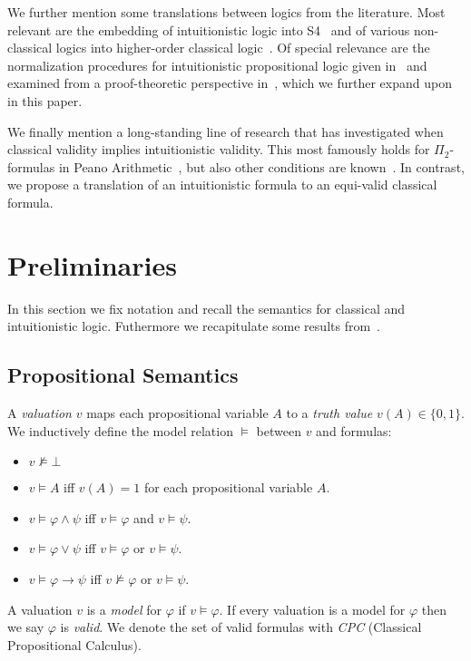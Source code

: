 \documentclass[runningheads]{llncs}
\begin{document}
We further mention some translations between logics from the literature.
Most relevant are the embedding of intuitionistic logic into S4~\cite{basicprooftheory} and of various non-classical logics into higher-order classical logic~\cite{LEO,wisniewski2016tptp}.
Of special relevance are the normalization procedures for intuitionistic propositional logic given in~\cite{claessen2015sat}
and examined from a proof-theoretic perspective in~\cite{fiorentini2019proof}, which we further expand upon in this paper.

We finally mention a long-standing line of research that has investigated when classical validity implies intuitionistic validity.
This most famously holds for $\Pi_2$-formulas in Peano Arithmetic~\cite{friedman1978classically}, but also other conditions are known~\cite{schwichtenberg}. 
In contrast, we propose a translation of an intuitionistic formula to an equi-valid classical formula.


\section{Preliminaries}

In this section we fix notation and recall the semantics for classical and intuitionistic logic. Futhermore we recapitulate some results from~\cite{otten2005clausal}.

\subsection{Propositional Semantics}

\begin{definition}
	A \emph{valuation} $v$ maps each propositional variable $A$ to a \emph{truth value} $v(A)\in\{0, 1\}$. We inductively define the model relation $\models$ between $v$ and formulas:
	\begin{itemize}
		\item $v\not\models \bot$
		\item $v\models A$ iff $v(A) = 1$ for each propositional variable $A$.
		\item $v\models \varphi\wedge\psi$ iff $v\models\varphi$ and $v\models\psi$.
		\item $v\models\varphi\vee\psi$ iff $v\models\varphi$ or $v\models\psi$.
		\item $v\models\varphi\to \psi$ iff $v\not\models\varphi$ or $v\models\psi$.
	\end{itemize}
	A valuation $v$ is a \emph{model} for $\varphi$ if $v\models\varphi$. If every valuation is a model for $\varphi$ then we say $\varphi$ is \emph{valid}. We denote the set of valid formulas with \emph{CPC} (Classical Propositional Calculus).
\end{definition}
\end{document}
